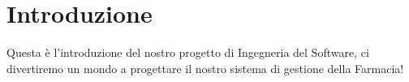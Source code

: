 \chapter{Introduzione}
Questa è l'introduzione del nostro progetto di Ingegneria del Software, ci divertiremo un mondo a progettare il nostro sistema di gestione della Farmacia!